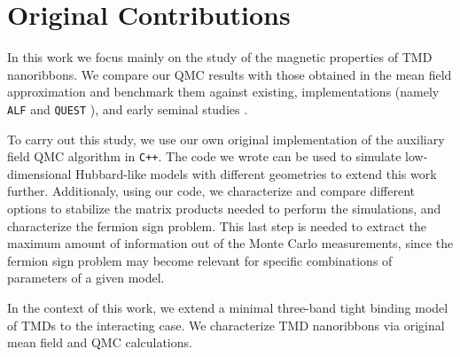 \section{Original Contributions}
\label{sec:int_contributions}

In this work we focus mainly on the study of the magnetic properties of \ac{TMD} nanoribbons.
We compare our \ac{QMC} results with those obtained in the mean field approximation and benchmark them  against existing,   implementations (namely \texttt{ALF} \cite{bercx_alf_2017} and \texttt{QUEST} \cite{noauthor_quest_2012}), and early seminal studies \cite{hirsch_discrete_1983,white_numerical_1989}.

To carry out this study, we use our own original implementation of the auxiliary field \ac{QMC} algorithm in \texttt{C++}.
The code we wrote can be used to simulate low-dimensional Hubbard-like models with different geometries to extend this work further.
Additionaly, using our code, we characterize and compare different options to stabilize the matrix products needed to perform the simulations, and characterize the fermion sign problem.
This last step is needed to extract the maximum amount of information out of the Monte Carlo measurements, since the fermion sign problem may become relevant for specific combinations of parameters of a given model.

In the context of this work, we extend a minimal three-band tight binding model of \acp{TMD} \cite{liu_three-band_2013} to the interacting case.
We characterize \ac{TMD} nanoribbons via original mean field and \ac{QMC} calculations.